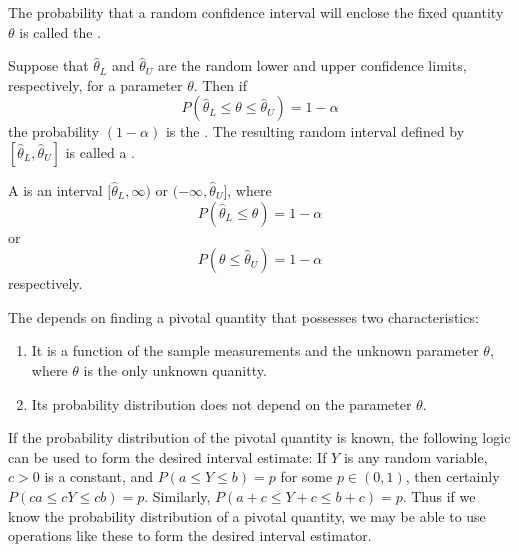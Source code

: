 \documentclass[12pt, a4paper, twoside, openright, titlepage]{book}
\begin{document}
\begin{defn}{}{}
    The probability that a random confidence interval will enclose the fixed quantity $\theta$ is called the .
\end{defn}

\begin{defn}{}{}
    Suppose that $\hat{\theta}_L$ and $\hat{\theta}_U$ are the random lower and upper confidence limits, respectively, for a parameter $\theta$. Then if \begin{equation*}
        P(\hat{\theta}_L \leq \theta \leq \hat{\theta}_U) = 1- \alpha
    \end{equation*}
    the probability $(1-\alpha)$ is the . The resulting random interval defined by $[\hat{\theta}_L,\hat{\theta}_U]$ is called a .
\end{defn}

\begin{defn}{}{}
    A  is an interval $[\hat{\theta}_L,\infty)$ or $(-\infty,\hat{\theta}_U]$, where \begin{equation*}
        P(\hat{\theta}_L \leq \theta) = 1 - \alpha
    \end{equation*}
    or \begin{equation*}
        P(\theta \leq \hat{\theta}_U) = 1- \alpha
    \end{equation*}
    respectively.
\end{defn}


\begin{defn}{}{}
    The  depends on finding a pivotal quantity that possesses two characteristics: \begin{enumerate}
        \item It is a function of the sample measurements and the unknown parameter $\theta$, where $\theta$ is the only unknown quanitty.
        \item Its probability distribution does not depend on the parameter $\theta$.
    \end{enumerate}
    If the probability distribution of the pivotal quantity is known, the following logic can be used to form the desired interval estimate: If $Y$ is any random variable, $c > 0$ is a constant, and $P(a\leq Y \leq b) = p$ for some $p \in (0,1)$, then certainly $P(ca \leq cY \leq cb) = p$. Similarly, $P(a+c\leq Y+c \leq b+c) = p$. Thus if we know the probability distribution of a pivotal quantity, we may be able to use operations like these to form the desired interval estimator.
\end{defn}
\end{document}
